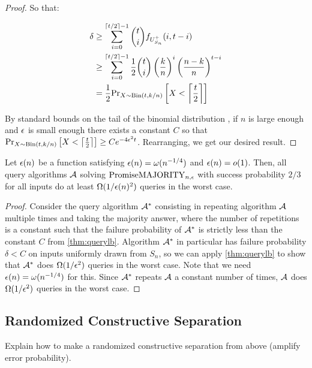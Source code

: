 \begin{proof}
So that:

\begin{align*}
\delta & \geq \sum_{i=0}^{\lceil t/2 \rceil-1} \binom{t}{i} f_{U^+_{S_n}}(i, t-i) \\
       & \geq \sum_{i=0}^{\lceil t/2 \rceil-1} \frac{1}{2} \binom{t}{i} \left(\frac{k}{n}\right)^i \left(\frac{n-k}{n} \right)^{t-i} \\
       & = \frac{1}{2} \text{Pr}_{X \sim \text{Bin}(t, k/n)}\left[X < \left\lceil \frac{t}{2} \right\rceil\right]
\end{align*}

By standard bounds on the tail of the binomial distribution \cite{Feller43},
if $n$ is large enough and $\epsilon$ is small enough there exists a constant $C$ so that 
$\text{Pr}_{X \sim \text{Bin}(t, k/n)}\left[X < \left\lceil \frac{t}{2} \right\rceil\right] \geq C e^{-4\epsilon^2t}$.
Rearranging, we get our desired result. 

\end{proof}

\begin{corollary}
Let $\epsilon(n)$ be a function satisfying $\epsilon(n) = \omega(n^{-1/4})$ and $\epsilon(n) = o(1)$. Then, all query
algorithms $\mathcal{A}$ solving $\mathrm{PromiseMAJORITY}_{n,\epsilon}$ with success probability $2/3$ for all inputs do at least $\Omega(1/\epsilon(n)^2)$
queries in the worst case. 
\end{corollary}
\begin{proof}
Consider the query algorithm $\mathcal{A}^*$ consisting in repeating algorithm $\mathcal{A}$  multiple times and 
taking the majority answer, where the number of repetitions is a constant such
that the failure probability of $\mathcal{A}^*$ is strictly less than 
the constant $C$ from \cref{thm:querylb}. 
Algorithm $\mathcal{A}^*$ in particular has failure probability $\delta < C$ on inputs 
uniformly drawn from $S_n$, so we can apply \cref{thm:querylb} to show that
$\mathcal{A}^*$ does $\Omega(1/\epsilon^2)$ queries in the worst case. Note that we need $\epsilon(n) = \omega(n^{-1/4})$
for this.
Since $\mathcal{A}^*$ repeats $\mathcal{A}$ a constant number of times, $\mathcal{A}$ does $\Omega(1/\epsilon^2)$ queries in the worst case. 
\end{proof}

\subsection{Randomized Constructive Separation}

Explain how to make a randomized constructive separation from above (amplify error probability).

